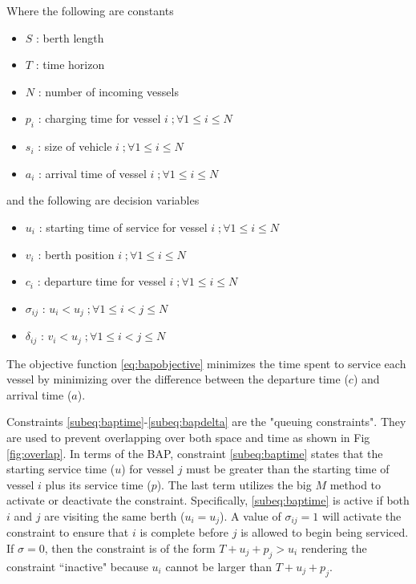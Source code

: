 \documentclass[letterpaper, 10pt, conference]{IEEEtran}
\begin{document}
\noindent
Where the following are constants

\begin{itemize}
	\item \(S\)   : berth length
	\item \(T\)   : time horizon
	\item \(N\)   : number of incoming vessels
	\item \(p_i\) : charging time for vessel \(i\;; \forall 1 \leq i \leq N\)
	\item \(s_i\) : size of vehicle \(i\;; \forall 1 \leq i \leq N\)
	\item \(a_i\) : arrival time of vessel \(i\;; \forall 1 \leq i \leq N\)
\end{itemize}

\noindent
and the following are decision variables

\begin{itemize}
    \item \(u_i\)         : starting time of service for vessel \(i\;; \forall 1 \leq i \leq N\)
    \item \(v_i\)         : berth position \(i\;; \forall 1 \leq i \leq N\)
    \item \(c_i\)         : departure time for vessel \(i\;; \forall 1 \leq i \leq N\)
    \item \(\sigma_{ij}\) : \(u_i < u_j\;; \forall 1 \leq i < j \leq N\)
    \item \(\delta_{ij}\) : \(v_i < u_j\;; \forall 1 \leq i < j \leq N\)
\end{itemize}

The objective function \eqref{eq:bapobjective} minimizes the time spent to service each vessel by minimizing over the difference between the departure time (\(c\)) and arrival time (\(a\)).

Constraints \ref{subeq:baptime}-\ref{subeq:bapdelta} are the "queuing constraints". They are used to prevent overlapping over both space and time as shown in Fig \ref{fig:overlap}. In terms of the BAP, constraint \eqref{subeq:baptime} states that the starting service time (\(u\)) for vessel \(j\) must be greater than the starting time of vessel \(i\) plus its service time (\(p\)). The last term utilizes the big \(M\) method to activate or deactivate the constraint. Specifically, \eqref{subeq:baptime} is active if both \(i\) and \(j\) are visiting the same berth (\(u_i = u_j\)). A value of \(\sigma_{ij} = 1\) will activate the constraint to ensure that \(i\) is complete before \(j\) is allowed to begin being serviced. If \(\sigma = 0\), then the constraint is of the form \(T + u_j + p_j > u_i\) rendering the constraint ``inactive" because \(u_i\) cannot be larger than \(T + u_j + p_j\).
\end{document}
